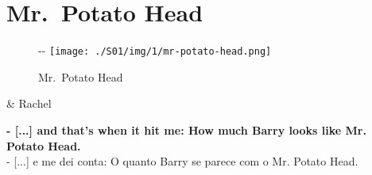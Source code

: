 \hypertarget{mr.-potato-head}{%
\section{Mr.~Potato Head}\label{mr.-potato-head}}

\begin{figure}[!ht]
  \begin{adjustwidth}{-\oddsidemargin-1in}{-\rightmargin}
    \centering
    \texttt{[image: ./S01/img/1/mr-potato-head.png]}
    \caption{Mr. Potato Head\label{fig:mr-potato-head}}
  \end{adjustwidth}
\end{figure}

\begin{tcolorbox}[enhanced,center upper,
    drop fuzzy shadow southeast, boxrule=0.3pt,
    lower separated=false,
    colframe=black!30!dialogoBorder,colback=white]
\begin{minipage}[c]{0.14\linewidth}
   & \centering \scriptsize{Rachel}
\end{minipage}
\hspace{.1mm}
\begin{minipage}[c]{0.8\linewidth}
  \textbf{- [...] and that's when it hit me: How much Barry looks like Mr. Potato Head.}\\
  - [...] e me dei conta: O quanto Barry se parece com o Mr. Potato Head.
\end{minipage}
\end{tcolorbox}

